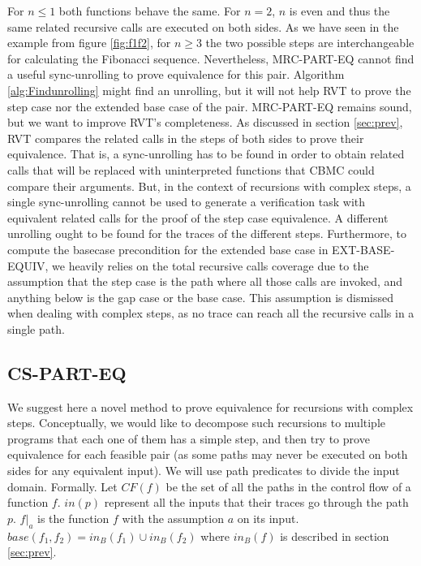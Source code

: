 For $n\leq 1$ both functions behave the same. For $n=2$, $n$ is even and thus the same related recursive calls are executed on both sides. As we have seen in the example from figure \ref{fig:f1f2}, for $n\geq3$ the two possible steps are interchangeable for calculating the Fibonacci sequence. Nevertheless, MRC-PART-EQ cannot find a useful sync-unrolling to prove equivalence for this pair. Algorithm \ref{alg:Findunrolling} might find an unrolling, but it will not help RVT to prove the step case nor the extended base case of the pair. MRC-PART-EQ remains sound, but we want to improve RVT's completeness. As discussed in section \ref{sec:prev}, RVT compares the related calls in the steps of both sides to prove their equivalence. That is, a sync-unrolling has to be found in order to obtain related calls that will be replaced with uninterpreted functions that CBMC could compare their arguments. But, in the context of recursions with complex steps, a single sync-unrolling cannot be used to generate a verification task with equivalent related calls for the proof of the step case equivalence. A different unrolling ought to be found for the traces of the different steps. Furthermore, to compute the basecase precondition for the extended base case in EXT-BASE-EQUIV, we heavily relies on the total recursive calls coverage due to the assumption that the step case is the path where all those calls are invoked, and anything below is the gap case or the base case. This assumption is dismissed when dealing with complex steps, as no trace can reach all the recursive calls in a single path.

\subsection{CS-PART-EQ}
We suggest here a novel method to prove equivalence for recursions with complex steps. Conceptually, we would like to decompose such recursions to multiple programs that each one of them has a simple step, and then try to prove equivalence for each feasible pair (as some paths may never be executed on both sides for any equivalent input). We will use path predicates to divide the input domain. Formally. Let $CF(f)$ be the set of all the paths in the control flow of a function $f$. $in(p)$ represent all the inputs that their traces go through the path $p$. $f|_a$ is the function $f$ with the assumption $a$ on its input. $base(f_1,f_2)=in_B(f_1) \cup in_B(f_2)$ where $in_B(f)$ is described in section \ref{sec:prev}.

